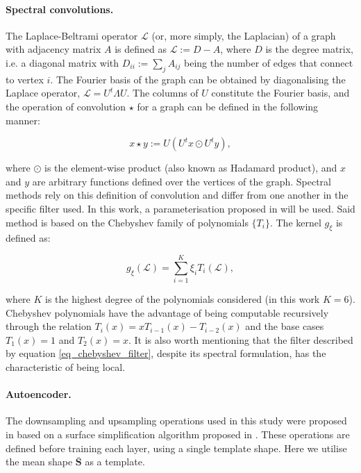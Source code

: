 \paragraph{Spectral convolutions.} The Laplace-Beltrami operator $\mathcal{L}$ (or, more simply, the Laplacian) of a graph with adjacency matrix $A$ is defined as $\mathcal{L}:=D-A$, where $D$ is the degree matrix, i.e. a diagonal matrix with $D_{ii}:=\sum_{j}A_{ij}$ being the number of edges that connect to vertex $i$. The Fourier basis of the graph can be obtained by diagonalising the Laplace operator, $\mathcal{L}=U^t\Lambda U$. The columns of $U$ constitute the Fourier basis, and the operation of convolution $\star$ for a graph can be defined in the following manner:

\begin{equation}
x\star y :=U(U^tx\odot U^ty),
\end{equation}{}

\noindent where $\odot$ is the element-wise product (also known as Hadamard product), and $x$ and $y$ are arbitrary functions defined over the vertices of the graph. Spectral methods rely on this definition of convolution and differ from one another in the specific filter used. In this work, a parameterisation proposed in \cite{ref_spectral_graph_conv} will be used. 
Said method is based on the Chebyshev family of polynomials $\{T_i\}$. The kernel $g_\xi$ is defined as:

\begin{equation}
g_{\xi}(\mathcal{L})=\sum_{i=1}^{K}\xi_i T_i(\mathcal{L}),
\label{eq_chebyshev_filter}
\end{equation}

\noindent where $K$ is the highest degree of the polynomials considered (in this work $K=6$). Chebyshev polynomials have the advantage of being computable recursively through the relation $T_i(x)=xT_{i-1}(x)-T_{i-2}(x)$ and the base cases $T_1(x)=1$ and $T_2(x)=x$. It is also worth mentioning that the filter described by equation \ref{eq_chebyshev_filter}, despite its spectral formulation, has the characteristic of being local.

\paragraph{Autoencoder.} The downsampling and upsampling operations used in this study were proposed in \cite{ref_coma} based on a surface simplification algorithm proposed in \cite{ref_quadric_error}. These operations are defined before training each layer, using a single template shape. Here we utilise the mean shape $\mathbf{\bar{S}}$ as a template.

